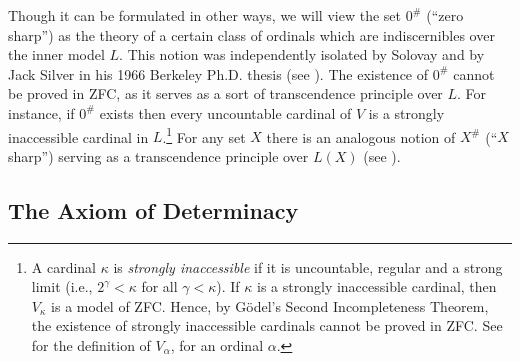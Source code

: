 \documentclass{book}%
\begin{document}
Though it can be formulated in other ways, we will view the set
$0^{\#}$ (``zero sharp'')
as the theory of a certain class of ordinals which are indiscernibles over the inner model $L$. This notion was independently isolated by Solovay 
and by Jack Silver in his 1966 Berkeley Ph.D. thesis (see
). The existence of $0^{\#}$ cannot be proved in
ZFC, as it serves as a sort of transcendence principle over $L$. For
instance, if $0^{\#}$ exists then every uncountable cardinal of $V$
is a strongly inaccessible cardinal in $L$.\footnote{A cardinal $\kappa$ is \emph{strongly
inaccessible} if it is uncountable, regular
and a strong limit (i.e., $2^{\gamma} < \kappa$ for all
$\gamma < \kappa$). If $\kappa$ is a strongly inaccessible cardinal,
then $V_{\kappa}$ is a model of ZFC. Hence, by G\"{o}del's Second
Incompleteness Theorem, the existence of strongly
inaccessible cardinals cannot be proved in ZFC.
See \cite{Jech:settheory} for the definition of
$V_{\alpha}$, for an ordinal $\alpha$.} For any set $X$ there is
an analogous notion of $X^{\#}$
(``$X$ sharp'') serving as a transcendence principle
over $L(X)$ (see \cite{Kanamori}).






\subsection{The Axiom of Determinacy}\label{adsubsec}
\end{document}
